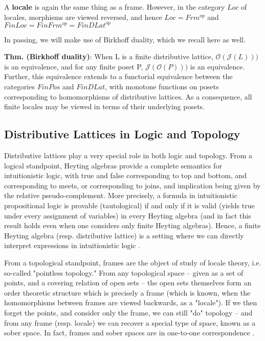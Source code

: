 \documentclass[hoptionsi,review,format=acmsmall]{acmart}
\theoremstyle{definition}
\newcommand{\Oc}{\mathcal{O}}
\newcommand{\Jc}{\mathcal{J}}
\begin{document}
A \textbf{locale} is again the same thing as a frame. However, in the category \(Loc\) of locales, morphisms are viewed reversed, and hence \(Loc = Frm^{op}\) and \(FinLoc = FinFrm^{op} = FinDLat^{op}\)

In passing, we will make use of Birkhoff duality, which we recall here as well.

\textbf{Thm. (Birkhoff duality)}: When L is a finite distributive lattice, \(\Oc(\Jc(L)))\) is an equivalence, and for any finite poset P,  \(\Jc(\Oc(P)))\) is an equivalence. Further, this equivalence extends to a functorial equivalence between the categories \(FinPos\) and \(FinDLat\), with monotone functions on posets corresponding to homomorphisms of distributive lattices. As a consequence, all finite locales may be viewed in terms of their underlying posets.

\subsection{Distributive Lattices in Logic and Topology}

Distributive lattices play a very special role in both logic and topology. From a logical standpoint, Heyting algebras provide a complete semantics for intuitionistic logic, with true and false corresponding to top and bottom, and corresponding to meets, or corresponding to joins, and implication being given by the relative pseudo-complement. More precisely, a formula in intuitionistic propositional logic is provable (tautological) if and only if it is valid (yields true under every assignment of variables) in every Heyting algebra (and in fact this result holds even when one considers only finite Heyting algebras). Hence, a finite Heyting algebra (resp. distributive lattice) is a setting where we can directly interpret expressions in intuitionistic logic \cite{van1988troelstra}.

From a topological standpoint, frames are the object of study of locale theory, i.e. so-called "pointless topology." From any topological space -- given as a set of points, and a covering relation of open sets -- the open sets themselves form an order theoretic structure which is precisely a frame (which is known, when the homomorphisms between frames are viewed backwards, as a "locale"). If we then forget the points, and consider only the frame, we can still "do" topology -- and from any frame (resp. locale) we can recover a special type of space, known as a sober space. In fact, frames and sober spaces are in one-to-one correspondence \cite{johnstone1982stone, vickers1996topology}.
\end{document}
